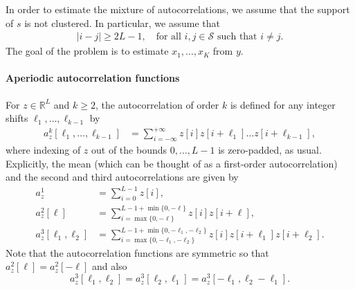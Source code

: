 \documentclass[english,11pt]{article}
\newcommand{\1}{\mathbf{1}}
\numberwithin{equation}{section}
\theoremstyle{plain}
\theoremstyle{definition}
\theoremstyle{remark}
\theoremstyle{plain}
\theoremstyle{remark}
\theoremstyle{plain}
\theoremstyle{plain}
\newcommand{\RL}{\mathbb{R}^L}
\newcommand{\SNR}{\ensuremath{\textsf{SNR}}}
\begin{document}
In order to estimate the mixture of autocorrelations, we assume that the support of $s$ is not clustered. In particular, we assume that
\begin{align}
  \vert i-j \vert\geq 2L-1,   \quad \text{for all } i,j\in\mathcal{S} \text{ such that } i\neq j.
  \label{eq:spacing}
\end{align}
The goal of the problem is to estimate $x_1,\ldots,x_K$ from $y$.


%
%

\paragraph{Aperiodic autocorrelation functions}
For  
$z\in\RL$ and $k\geq 2$, the autocorrelation of order $k$ is defined for any integer shifts $\ell_1, \ldots, \ell_{k-1}$ by
\begin{align}
	a_z^k[\ell_1,\ldots,\ell_{k-1}]  & = \sum_{i=-\infty}^{+\infty} z[i]z[i+\ell_1]\ldots z[i+\ell_{k-1}],
	\label{eq:ac_general}
\end{align}
where indexing of $z$ out of the bounds $0, \ldots, L-1$ is zero-padded, as usual.
Explicitly, the mean (which can be thought of as a first-order autocorrelation) and the second and third autocorrelations are given by
\begin{align} 
	a_z^1 & = \sum_{i=0}^{L-1} z[i], \nonumber\\
	a_z^2[\ell] & = \sum_{i = \max\{0, -\ell\}}^{L-1 + \min\{0, -\ell\}} z[i]z[i+\ell], \nonumber\\
	a_z^3[\ell_1,\ell_2] & = \sum_{i = \max\{0, -\ell_1, -\ell_2\}}^{L-1 + \min\{0, -\ell_1, -\ell_2\}} z[i]z[i+\ell_1]z[i+\ell_2]. \label{eq:ac_special}
\end{align}
Note that the autocorrelation functions are symmetric so that $a_z^2[\ell] = a_z^2[-\ell]$ and also $$a_z^3[\ell_1,\ell_2] = a_z^3[\ell_2,\ell_1]=a_z^3[-\ell_1,\ell_2-\ell_1].$$
\end{document}
